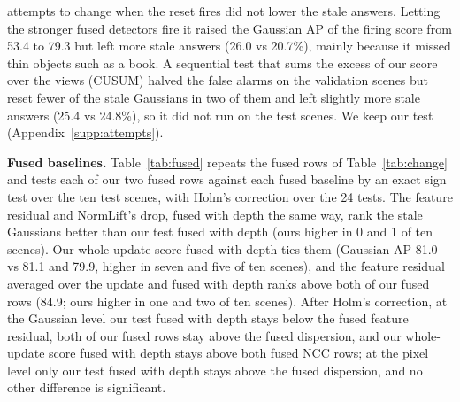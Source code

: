 \documentclass[journal]{IEEEtran}
\begin{document}
attempts to change when the reset fires did not lower the stale answers. Letting the stronger fused detectors fire it raised the Gaussian AP of the firing score from 53.4 to 79.3 but left more stale answers (26.0 vs 20.7\%), mainly because it missed thin objects such as a book. A sequential test that sums the excess of our score over the views (CUSUM) halved the false alarms on the validation scenes but reset fewer of the stale Gaussians in two of them and left slightly more stale answers (25.4 vs 24.8\%), so it did not run on the test scenes. We keep our test (Appendix~\ref{supp:attempts}).

\textbf{Fused baselines.} Table~\ref{tab:fused} repeats the fused rows of Table~\ref{tab:change} and tests each of our two fused rows against each fused baseline by an exact sign test over the ten test scenes, with Holm's correction over the 24 tests. The feature residual and NormLift's drop, fused with depth the same way, rank the stale Gaussians better than our test fused with depth (ours higher in 0 and 1 of ten scenes). Our whole-update score fused with depth ties them (Gaussian AP 81.0 vs 81.1 and 79.9, higher in seven and five of ten scenes), and the feature residual averaged over the update and fused with depth ranks above both of our fused rows (84.9; ours higher in one and two of ten scenes). After Holm's correction, at the Gaussian level our test fused with depth stays below the fused feature residual, both of our fused rows stay above the fused dispersion, and our whole-update score fused with depth stays above both fused NCC rows; at the pixel level only our test fused with depth stays above the fused dispersion, and no other difference is significant.
\end{document}
